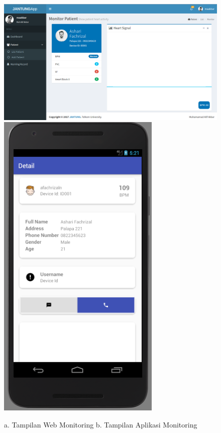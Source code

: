\begin{figure}[H]
	\centering
	\includegraphics[scale=0.26]{images/web_app.png}
	\label{fig:viewer_apps}
	\includegraphics[scale=0.3]{images/phone_app.png}
	\caption{a. Tampilan Web Monitoring b. Tampilan Aplikasi Monitoring}
	\label{fig:viewer_apps}
\end{figure}

